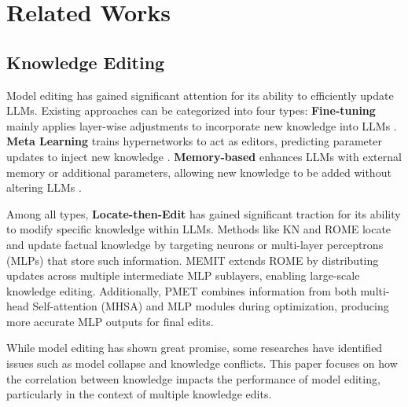\section{Related Works}
\label{sec:appendix}

\subsection{Knowledge Editing}
Model editing has gained significant attention for its ability to efficiently update LLMs. Existing approaches can be categorized into four types: \textbf{Fine-tuning} mainly applies layer-wise adjustments to incorporate new knowledge into LLMs \cite{zhu2021modifying}. \textbf{Meta Learning} trains hypernetworks to act as editors, predicting parameter updates to inject new knowledge \cite{de2021editing, mitchell2022fast}. \textbf{Memory-based} enhances LLMs with external memory or additional parameters, allowing new knowledge to be added without altering LLMs \cite{mitchell2022memory, huang2023transformerpatcher}.

Among all types, \textbf{Locate-then-Edit} has gained significant traction for its ability to modify specific knowledge within LLMs. Methods like KN\cite{dai-etal-2022-knowledge} and ROME\cite{meng2022locating} locate and update factual knowledge by targeting neurons or multi-layer perceptrons (MLPs) that store such information. MEMIT\cite{meng2022memit} extends ROME by distributing updates across multiple intermediate MLP sublayers, enabling large-scale knowledge editing. Additionally, PMET\cite{li2024pmet} combines information from both multi-head Self-attention (MHSA) and MLP modules during optimization, producing more accurate MLP outputs for final edits.

While model editing has shown great promise, some researches have identified issues such as model collapse\cite{yang2024butterfly, gu2024model} and knowledge conflicts\cite{li2024unveiling}. This paper focuses on how the correlation between knowledge impacts the performance of model editing, particularly in the context of multiple knowledge edits.



